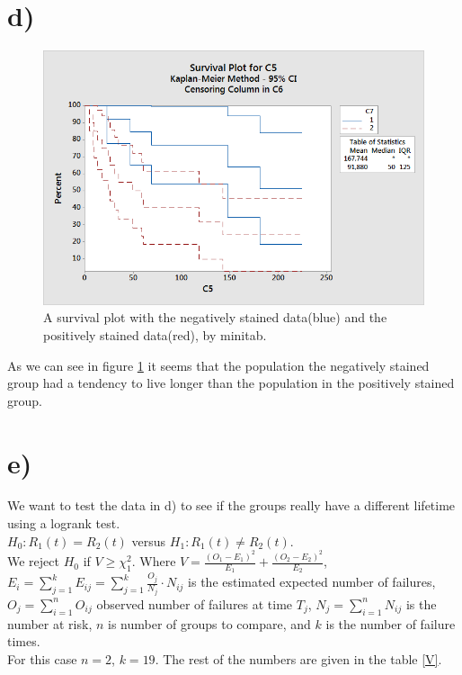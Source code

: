 \documentclass[10pt, a4paper]{article}
\begin{document}
\section*{d)}
     
\begin{center}
\begin{figure}[h!]
\centering
\includegraphics[scale=0.75]{same.png}
\caption{A survival plot with the negatively stained data(blue) and the positively stained data(red), by minitab.}
\label{same}
\end{figure}
\end{center}
As we can see in figure \ref{same} it seems that the population the negatively stained group had a tendency to live longer than the population in the positively stained group.

\section*{e)}
We want to test the data in d) to see if the groups really have a different lifetime using a logrank test. \\
$H_0 : R_1(t)=R_2(t) $ versus $ H_1 : R_1(t) \neq R_2(t) $.\\ We reject $H_0$ if $V \geq \chi^2_1 $. Where $V = \frac{(O_1-E_1)^2}{E_1}+\frac{(O_2-E_2)^2}{E_2} $, $E_i = \sum_{j=1}^k E_{i j} = \sum_{j=1}^k \frac{O_j}{N_j} \cdot N_{i j}$ is the estimated expected number of failures, $ O_j = \sum_{i=1}^n O_{i j}$ observed number of failures at time $T_j$, $N_j = \sum_{i=1}^n N_{i j}$ is the number at risk, $n$ is number of groups to compare, and $k$ is the number of failure times.\\
For this case $n =2$, $k = 19$. The rest of the numbers are given in the table \ref{V}. 
\end{document}
